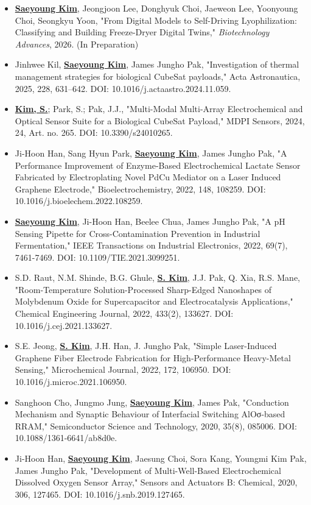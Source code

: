 \documentclass[letterpaper,11pt]{moderncv}
\begin{document}
\begin{sloppypar} %
\begin{itemize}[leftmargin=1cm, itemsep=0pt, parsep=0pt]
    \item \textbf{\underline{Saeyoung Kim}}, Jeongjoon Lee, Donghyuk Choi, Jaeweon Lee, Yoonyoung Choi, Seongkyu Yoon, "From Digital Models to Self-Driving Lyophilization: Classifying and Building Freeze-Dryer Digital Twins," \textit{Biotechnology Advances}, 2026. (In Preparation)
    \item Jinhwee Kil, \textbf{\underline{Saeyoung Kim}}, James Jungho Pak, "Investigation of thermal management strategies for biological CubeSat payloads," Acta Astronautica, 2025, 228, 631--642. DOI: 10.1016/j.actaastro.2024.11.059.
    \item \textbf{\underline{Kim, S.}}; Park, S.; Pak, J.J., "Multi-Modal Multi-Array Electrochemical and Optical Sensor Suite for a Biological CubeSat Payload," MDPI Sensors, 2024, 24, Art. no. 265. DOI: 10.3390/s24010265.
    \item Ji-Hoon Han, Sang Hyun Park, \textbf{\underline{Saeyoung Kim}}, James Jungho Pak, "A Performance Improvement of Enzyme-Based Electrochemical Lactate Sensor Fabricated by Electroplating Novel PdCu Mediator on a Laser Induced Graphene Electrode," Bioelectrochemistry, 2022, 148, 108259. DOI: 10.1016/j.bioelechem.2022.108259.
    \item \textbf{\underline{Saeyoung Kim}}, Ji-Hoon Han, Beelee Chua, James Jungho Pak, "A pH Sensing Pipette for Cross-Contamination Prevention in Industrial Fermentation," IEEE Transactions on Industrial Electronics, 2022, 69(7), 7461-7469. DOI: 10.1109/TIE.2021.3099251.
    \item S.D. Raut, N.M. Shinde, B.G. Ghule, \textbf{\underline{S. Kim}}, J.J. Pak, Q. Xia, R.S. Mane, "Room-Temperature Solution-Processed Sharp-Edged Nanoshapes of Molybdenum Oxide for Supercapacitor and Electrocatalysis Applications," Chemical Engineering Journal, 2022, 433(2), 133627. DOI: 10.1016/j.cej.2021.133627.
    \item S.E. Jeong, \textbf{\underline{S. Kim}}, J.H. Han, J. Jungho Pak, "Simple Laser-Induced Graphene Fiber Electrode Fabrication for High-Performance Heavy-Metal Sensing," Microchemical Journal, 2022, 172, 106950. DOI: 10.1016/j.microc.2021.106950.
    \item Sanghoon Cho, Jungmo Jung, \textbf{\underline{Saeyoung Kim}}, James Pak, "Conduction Mechanism and Synaptic Behaviour of Interfacial Switching AlOσ-based RRAM," Semiconductor Science and Technology, 2020, 35(8), 085006. DOI: 10.1088/1361-6641/ab8d0e.
    \item Ji-Hoon Han, \textbf{\underline{Saeyoung Kim}}, Jaesung Choi, Sora Kang, Youngmi Kim Pak, James Jungho Pak, "Development of Multi-Well-Based Electrochemical Dissolved Oxygen Sensor Array," Sensors and Actuators B: Chemical, 2020, 306, 127465. DOI: 10.1016/j.snb.2019.127465.
\end{itemize}
\end{sloppypar}
\end{document}
